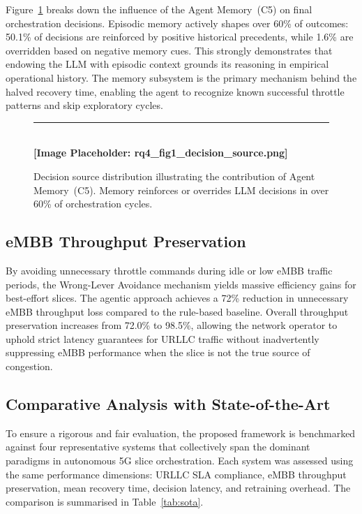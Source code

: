 \documentclass[12pt]{article}
\begin{document}
Figure~\ref{fig:decision_source} breaks down the influence of the Agent
Memory~(C5) on final orchestration decisions. Episodic memory actively
shapes over 60\% of outcomes: 50.1\% of decisions are reinforced by
positive historical precedents, while 1.6\% are overridden based on
negative memory cues. This strongly demonstrates that endowing the LLM
with episodic context grounds its reasoning in empirical operational
history. The memory subsystem is the primary mechanism behind the halved
recovery time, enabling the agent to recognize known successful throttle
patterns and skip exploratory cycles.

\begin{figure}[H]
\centering
\rule{\textwidth}{6cm} \\ \vspace{0.5em}\centering\textbf{[Image Placeholder: rq4\_fig1\_decision\_source.png]}
\caption{Decision source distribution illustrating the contribution of
Agent Memory~(C5). Memory reinforces or overrides LLM decisions in over
60\% of orchestration cycles.}
\label{fig:decision_source}
\end{figure}

\subsection{eMBB Throughput Preservation}

By avoiding unnecessary throttle commands during idle or low eMBB traffic periods,
the Wrong-Lever Avoidance mechanism yields massive efficiency gains for best-effort slices.
The agentic approach achieves a 72\% reduction in unnecessary eMBB throughput loss
compared to the rule-based baseline. Overall throughput preservation increases
from 72.0\% to 98.5\%, allowing the network operator to uphold strict latency guarantees
for URLLC traffic without inadvertently suppressing eMBB performance when the slice
is not the true source of congestion.

\subsection{Comparative Analysis with State-of-the-Art}

To ensure a rigorous and fair evaluation, the proposed framework is benchmarked
against four representative systems that collectively span the dominant paradigms
in autonomous 5G slice orchestration. Each system was assessed using the same
performance dimensions: URLLC SLA compliance, eMBB throughput preservation,
mean recovery time, decision latency, and retraining overhead. The comparison is
summarised in Table~\ref{tab:sota}.
\end{document}
